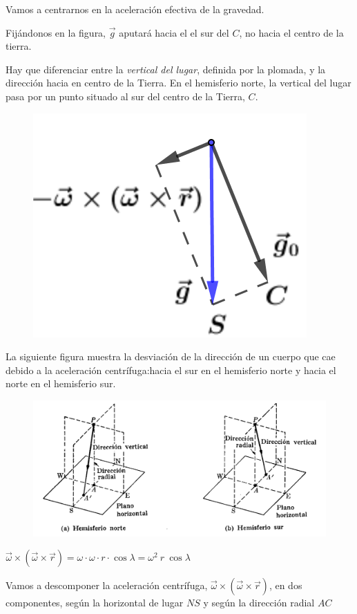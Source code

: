 Vamos a centrarnos en la aceleración efectiva de la gravedad.

\begin{multicols}{2}
Fijándonos en la figura, $\vec g$ aputará hacia el el sur del $C$, no hacia el centro de la tierra.

Hay que diferenciar entre la \emph{vertical del lugar}, definida por la plomada, y la dirección hacia en centro de la Tierra. En el hemisferio norte, la vertical del lugar pasa por un punto situado al sur del centro de la Tierra, $C$. 
\begin{figure}[H]
	\centering
	\includegraphics[width=.35\textwidth]{imagenes/imagenes11/T11IM02.png}
\end{figure}
\end{multicols}

La siguiente figura muestra la desviación de la dirección de un cuerpo que cae debido a la aceleración centrífuga:hacia el sur en el hemisferio norte y hacia el norte en el hemisferio sur.

\begin{figure}[H]
	\centering
	\includegraphics[width=1\textwidth]{imagenes/imagenes11/T11IM08.png}
\end{figure}


$\vec \omega \times (\vec \omega \times \vec r)= \omega \cdot \omega \cdot r \cdot \cos \lambda =\omega^2 \ r \ \cos \lambda$

Vamos a descomponer la aceleración centrífuga, $\vec \omega \times (\vec \omega \times \vec r)$, en dos componentes, según la horizontal de lugar $NS$ y según la dirección radial $AC$

